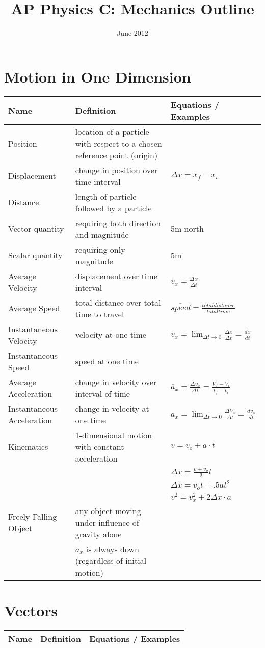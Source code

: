 \documentclass[11pt]{article}
\title{AP Physics C: Mechanics Outline}
\date{June 2012}
\begin{document}
\maketitle
\pagebreak

\section{Motion in One Dimension}
\begin{tabularx}{\textwidth}{l| X l}
    Name & Definition & Equations / Examples \\ \hline
    Position & location of a particle with respect to a chosen reference point (origin) & \\ \hline
    Displacement & change in position over time interval & $ \Delta x=x_{f} - x_{i} $ \bigstrut \\ \hline
    Distance & length of particle followed by a particle & \\ \hline
    Vector quantity & requiring both direction and magnitude & 5m north \\ \hline
    Scalar quantity & requiring only magnitude & 5m \\ \hline
    Average Velocity & displacement over time interval & $ \overline{v}_{x} = \frac{ \Delta x}{ \Delta t } $ \bigstrut \\ \hline
    Average Speed & total distance over total time to travel & $ \overline{speed} = \frac{ total distance }{ total time } $ \bigstrut \\ \hline
    Instantaneous Velocity & velocity at one time & $ v_{x} = \lim_{ \Delta t \to 0} \frac{\Delta x}{\Delta t} = \frac{dx}{dt} $ \bigstrut \\ \hline
    Instantaneous Speed & speed at one time & \\ \hline
    Average Acceleration & change in velocity over interval of time & $ \overline{a}_{x} = \frac{\Delta v_{x}}{\Delta t} = \frac{V_{f}-V_{i}}{t_{f}-t_{i}} $ \bigstrut \\ \hline
    Instantaneous Acceleration & change in velocity at one time & $ \overline{a}_{x} = \lim_{\Delta t \to 0} \frac{\Delta V_{s}}{\Delta t} = \frac{dv_{s}}{dt} $ \bigstrut \\ \hline
    Kinematics & 1-dimensional motion with constant acceleration & $ v= v_{o} + a \cdot t $ \\* & & $ \Delta x = \frac{v + v_{o}}{2}t $ \\* & & $ \Delta x = v_{o}t + .5at^{2} $ \\* & & $ v^{2} = v^{2}_{x}+ 2\Delta x \cdot a$ \bigstrut \\ \hline
    Freely Falling Object & any object moving under influence of gravity alone \\* & $ a_{x} $ is always down (regardless of initial motion) \\ \hline
\end{tabularx}

\section{Vectors}
\begin{tabularx}{\textwidth}{l| X l}
    Name & Definition & Equations / Examples \\ \hline

\end{tabularx}
\end{document}
